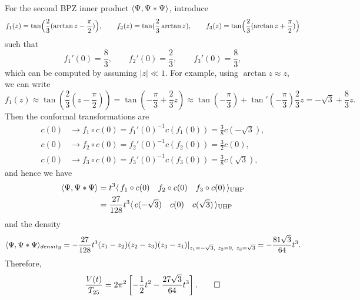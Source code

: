 \documentclass{../../../small}
\begin{document}
\begin{sol}
For the second BPZ inner product $\langle\Psi,\Psi*\Psi\rangle$, introduce
\[f_1(z)=\tan\Bigl(\frac23(\arctan z-\frac\pi2)\Bigr),\qquad f_2(z)=\tan(\frac23\arctan z),\qquad f_3(z)=\tan\Bigl(\frac23(\arctan z+\frac\pi2)\Bigr)\]
such that
\[f_1'(0)=\frac83,\qquad f_2'(0)=\frac23,\qquad f_3'(0)=\frac83,\]
which can be computed by assuming $|z|\ll1$.
For example, using $\arctan z\approx z$, we can write
\[f_1(z)\approx\tan(\frac23(z-\frac\pi2))=\tan(-\frac\pi3+\frac23 z)\approx\tan(-\frac\pi3)+\tan'(-\frac\pi3)\frac23z=-\sqrt3+\frac83z.\]
Then the conformal transformations are
\begin{align*}
c(0)&\to f_1\circ c(0)=f_1'(0)^{-1}c(f_1(0))=\frac38c(-\sqrt3),\\
c(0)&\to f_2\circ c(0)=f_2'(0)^{-1}c(f_2(0))=\frac32c(0),\\
c(0)&\to f_3\circ c(0)=f_3'(0)^{-1}c(f_3(0))=\frac38c(\sqrt3),
\end{align*}
and hence we have
\begin{align*}
\langle\Psi,\Psi*\Psi\rangle
&=t^3\langle\,f_1\circ c(0)\quad f_2\circ c(0)\quad f_3\circ c(0)\,\rangle_{\mathrm{UHP}}\\
&=\frac{27}{128}t^3\langle\,c(-\sqrt3)\quad c(0)\quad c(\sqrt3)\,\rangle_{\mathrm{UHP}}
\end{align*}
and the density
\[\<\Psi,\Psi*\Psi\>_{density}=-\frac{27}{128}t^3(z_1-z_2)(z_2-z_3)(z_3-z_1)|_{z_1=-\sqrt3,\ z_2=0,\ z_3=\sqrt3}=-\frac{81\sqrt3}{64}t^3.\]
Therefore,
\[\frac{V(t)}{T_{25}}=2\pi^2\left[-\frac12t^2-\frac{27\sqrt3}{64}t^3\right].\qedhere\]
\end{sol}
\end{document}
